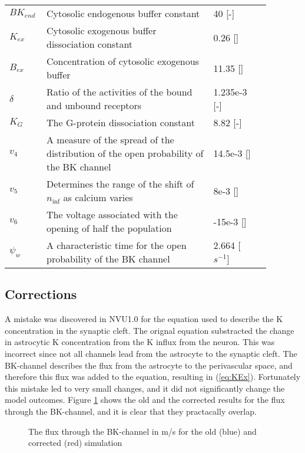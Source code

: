 \begin{table}[h!]
	\centering
	\begin{tabular}{| p{0.09\linewidth} | >{\footnotesize} p{0.6\linewidth} | >{\footnotesize} p{0.17\linewidth} | >{\footnotesize} p{0.02\linewidth} |}
		\arrayrulecolor{lightgrey}\hline
		
		$BK_{end}$      & Cytosolic endogenous buffer constant                              & 40 [-] & \cite{LoesEvert} \\
		$K_{ex}$        & Cytosolic exogenous buffer dissociation constant                  & 0.26 [\uM] & \cite{LoesEvert} \\
		$B_{ex}$        & Concentration of cytosolic exogenous buffer                       & 11.35 [\uM] & \cite{LoesEvert} \\
		$\delta$        & Ratio of the activities of the bound and unbound receptors        & 1.235e-3 [-] & \cite{Farr2011}\\
		$K_G$           & The G-protein dissociation constant                               & 8.82  [-] & \cite{Farr2011}\\
		$v_{4}$			& A measure of the spread of the distribution of the open probability of the BK channel	& 14.5e-3 [\Volt]   &  \cite{Gonzalez1994} \\
		$v_{5}$			& Determines the range of the shift of $n_{\inf}$ as calcium varies    	& 8e-3 [\Volt]  & \cite{Farr2011}  \\
		$v_{6}$			& The voltage associated with the opening of half the population		& -15e-3 [\Volt]  & \cite{Farr2011}  \\
		$ \psi_{w}$    	& A characteristic time for the open probability of the BK channel		& 2.664 [$s^{-1}$] & \cite{Gonzalez1994} \\
		
		\hline
	\end{tabular}
\end{table}

\subsection{Corrections}
A mistake was discovered in NVU1.0 for the equation used to describe the \gls{K} concentration in the synaptic cleft. The orignal equation substracted the change in astrocytic \gls{K} concentration from the \gls{K} influx from the neuron. This was incorrect since not all channels lead from the astrocyte to the synaptic cleft. The BK-channel describes the flux from the astrocyte to the perivascular space, and therefore this flux was added to the equation, resulting in (\ref{eq:KEx}). Fortunately this mistake led to very small changes, and it did not significantly change the model outcomes. Figure \ref{fig:cordif} shows the old and the corrected results for the flux through the BK-channel, and it is clear that they practacally overlap. 

\begin{figure}[h!]
	\centering
	\tiny 
				\newlength\figureheight 
				\newlength\figurewidth 
	\setlength\figureheight{5 cm} 
	\setlength\figurewidth{15 cm}
	
	\caption{The flux through the BK-channel in \uM m/s for the old (blue) and corrected (red) simulation }
	\label{fig:cordif}
\end{figure}